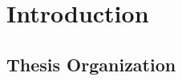 
\chapter{Introduction}
\label{ch:intro}



\section{Thesis Organization}
\label{sec:intro:thesisorg}

